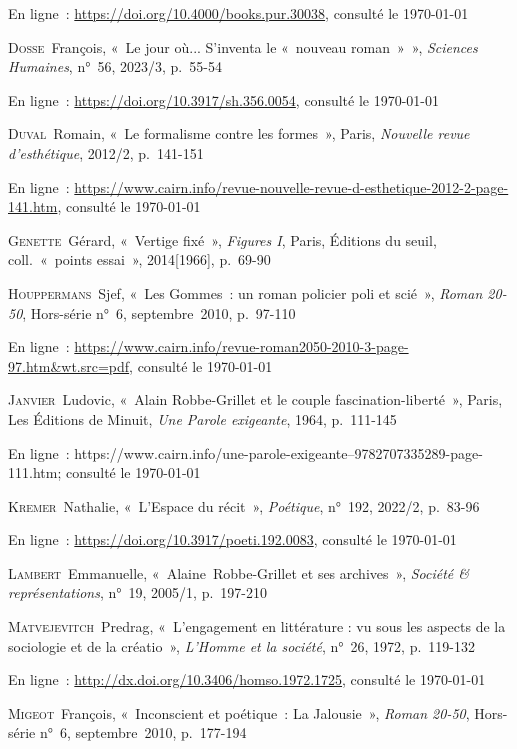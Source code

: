 			En ligne~: \hyperlink{https://doi.org/10.4000/books.pur.30038}{https://doi.org/10.4000/books.pur.30038}, consulté le \today
		\par
	\textsc{Dosse}~François, «~Le jour où... S'inventa le «~nouveau roman~»~»,  \textit{Sciences Humaines}, n°~56, 2023/3, p.~55-54
			
			En ligne~: \hyperlink{https://doi.org/10.3917/sh.356.0054}{https://doi.org/10.3917/sh.356.0054}, consulté le \today
		\par
	\textsc{Duval}~Romain, «~Le formalisme contre les formes~», Paris, \textit{Nouvelle revue d’esthétique}, 2012/2, p.~141-151
			
			En ligne~: \hyperlink{https://www.cairn.info/revue-nouvelle-revue-d-esthetique-2012-2-page-141.htm}{https://www.cairn.info/revue-nouvelle-revue-d-esthetique-2012-2-page-141.htm}, consulté le \today
		\par
	\textsc{Genette}~Gérard, «~Vertige fixé~», \textit{Figures I}, Paris, Éditions du seuil, coll.~«~points essai~», 2014[1966], p.~69-90\par
	\textsc{Houppermans}~Sjef, «~Les Gommes~: un roman policier poli et scié~»,  \textit{Roman 20-50}, Hors-série n°~6, septembre~2010, p.~97-110
			
			En ligne~: \hyperlink{https://www.cairn.info/revue-roman2050-2010-3-page-97.htm\&wt.src=pdf}{https://www.cairn.info/revue-roman2050-2010-3-page-97.htm\&wt.src=pdf}, consulté le \today
		\par
	\textsc{Janvier}~Ludovic, «~Alain Robbe-Grillet et le couple fascination-liberté~», Paris, Les Éditions de Minuit, \textit{Une Parole exigeante}, 1964, p.~111-145

En ligne~: https://www.cairn.info/une-parole-exigeante--9782707335289-page-111.htm; consulté le \today \par
	\textsc{Kremer}~Nathalie, «~L'Espace du récit~»,  \textit{Poétique}, n°~192, 2022/2, p.~83-96
			
			En ligne~: \hyperlink{https://doi.org/10.3917/poeti.192.0083}{https://doi.org/10.3917/poeti.192.0083}, consulté le \today
		\par
	\textsc{Lambert}~Emmanuelle, «~Alaine~Robbe-Grillet et ses archives~»,  \textit{Société \& représentations}, n°~19, 2005/1, p.~197-210\par
	\textsc{Matvejevitch}~Predrag, «~L'engagement en littérature : vu sous les aspects de la sociologie et de la créatio~»,  \textit{L'Homme et la société}, n°~26, 1972, p.~119-132
			
			En ligne~: \hyperlink{http://dx.doi.org/10.3406/homso.1972.1725}{http://dx.doi.org/10.3406/homso.1972.1725}, consulté le \today
		\par
	\textsc{Migeot}~François, «~Inconscient et poétique~: La Jalousie~»,  \textit{Roman 20-50}, Hors-série n°~6, septembre~2010, p.~177-194
			
